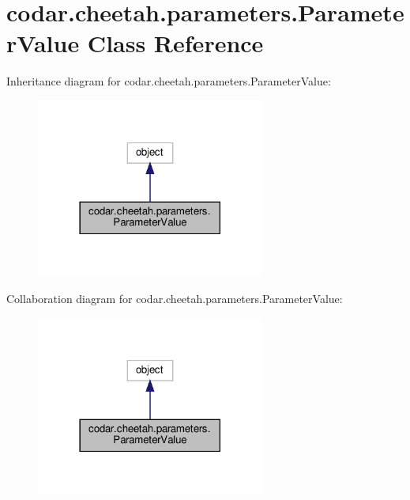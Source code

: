 \hypertarget{classcodar_1_1cheetah_1_1parameters_1_1_parameter_value}{}\section{codar.\+cheetah.\+parameters.\+Parameter\+Value Class Reference}
\label{classcodar_1_1cheetah_1_1parameters_1_1_parameter_value}


Inheritance diagram for codar.\+cheetah.\+parameters.\+Parameter\+Value\+:
\nopagebreak
\begin{figure}[H]
\begin{center}
\leavevmode
\includegraphics[width=213pt]{classcodar_1_1cheetah_1_1parameters_1_1_parameter_value__inherit__graph}
\end{center}
\end{figure}


Collaboration diagram for codar.\+cheetah.\+parameters.\+Parameter\+Value\+:
\nopagebreak
\begin{figure}[H]
\begin{center}
\leavevmode
\includegraphics[width=213pt]{classcodar_1_1cheetah_1_1parameters_1_1_parameter_value__coll__graph}
\end{center}
\end{figure}
